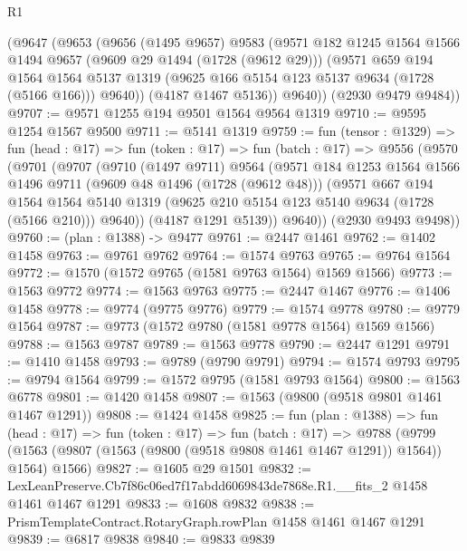 \begin{lexlean}{R1}
\begin{coremodule}
      (@9647
        (@9653
          (@9656
            (@1495 @9657)
            @9583
            (@9571
              @182
              @1245
              @1564
              @1566
              @1494
              @9657
              (@9609 @29 @1494 (@1728 (@9612 @29)))
              (@9571
                @659
                @194
                @1564
                @1564
                @5137
                @1319
                (@9625 @166 @5154 @123 @5137 @9634 (@1728 (@5166 @166)))
                @9640))
            (@4187 @1467 @5136))
          @9640))
      (@2930 @9479 @9484))
@9707 := @9571 @1255 @194 @9501 @1564 @9564 @1319
@9710 := @9595 @1254 @1567 @9500
@9711 := @5141 @1319
@9759 := fun (tensor : @1329) =>
  fun (head : @17) =>
  fun (token : @17) =>
  fun (batch : @17) =>
  @9556
    (@9570
      (@9701
        (@9707
          (@9710
            (@1497 @9711)
            @9564
            (@9571
              @184
              @1253
              @1564
              @1566
              @1496
              @9711
              (@9609 @48 @1496 (@1728 (@9612 @48)))
              (@9571
                @667
                @194
                @1564
                @1564
                @5140
                @1319
                (@9625 @210 @5154 @123 @5140 @9634 (@1728 (@5166 @210)))
                @9640))
            (@4187 @1291 @5139))
          @9640))
      (@2930 @9493 @9498))
@9760 := (plan : @1388) -> @9477
@9761 := @2447 @1461
@9762 := @1402 @1458
@9763 := @9761 @9762
@9764 := @1574 @9763
@9765 := @9764 @1564
@9772 := @1570 (@1572 @9765 (@1581 @9763 @1564) @1569 @1566)
@9773 := @1563 @9772
@9774 := @1563 @9763
@9775 := @2447 @1467
@9776 := @1406 @1458
@9778 := @9774 (@9775 @9776)
@9779 := @1574 @9778
@9780 := @9779 @1564
@9787 := @9773 (@1572 @9780 (@1581 @9778 @1564) @1569 @1566)
@9788 := @1563 @9787
@9789 := @1563 @9778
@9790 := @2447 @1291
@9791 := @1410 @1458
@9793 := @9789 (@9790 @9791)
@9794 := @1574 @9793
@9795 := @9794 @1564
@9799 := @1572 @9795 (@1581 @9793 @1564)
@9800 := @1563 @6778
@9801 := @1420 @1458
@9807 := @1563 (@9800 (@9518 @9801 @1461 @1467 @1291))
@9808 := @1424 @1458
@9825 := fun (plan : @1388) =>
  fun (head : @17) =>
  fun (token : @17) =>
  fun (batch : @17) =>
  @9788 (@9799 (@1563 (@9807 (@1563 (@9800 (@9518 @9808 @1461 @1467 @1291)) @1564)) @1564) @1566)
@9827 := @1605 @29 @1501
@9832 := LexLeanPreserve.Cb7f86c06ed7f17abdd6069843de7868e.R1.__fits_2 @1458 @1461 @1467 @1291
@9833 := @1608 @9832
@9838 := PrismTemplateContract.RotaryGraph.rowPlan @1458 @1461 @1467 @1291
@9839 := @6817 @9838
@9840 := @9833 @9839

\end{coremodule}
\end{lexlean}
